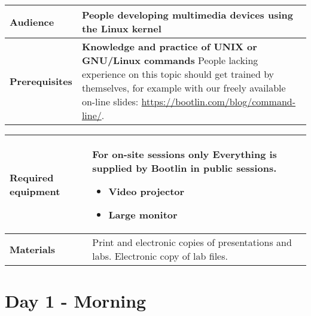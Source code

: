 \documentclass[a4paper,12pt,obeyspaces,spaces,hyphens]{article}
\begin{document}
{\begin{tabularx}{\textwidth}{|g|h|}
    {\bf Audience} & People developing multimedia devices using the Linux kernel\\
    \hline

    {\bf Prerequisites} &
    {\bf Knowledge and practice of UNIX or GNU/Linux commands}
    \newline People lacking experience on this topic should get
    trained by themselves, for example with our freely available
    on-line slides:
    \newline \url{https://bootlin.com/blog/command-line/}. \\
    \hline

  \end{tabularx}

  \begin{tabularx}{\textwidth}{|g|h|}
    {\bf Required equipment} &
    {\bf For on-site sessions only}
    \newline Everything is supplied by Bootlin in public sessions.
    \begin{itemize}
    \item Video projector
    \item Large monitor
    \end{itemize}\\
    \hline

    {\bf Materials} & Print and electronic copies of presentations and
    labs.
    \newline Electronic copy of lab files.\\
    \hline

\end{tabularx}}
\normalsize

\section{Day 1 - Morning}
\end{document}
